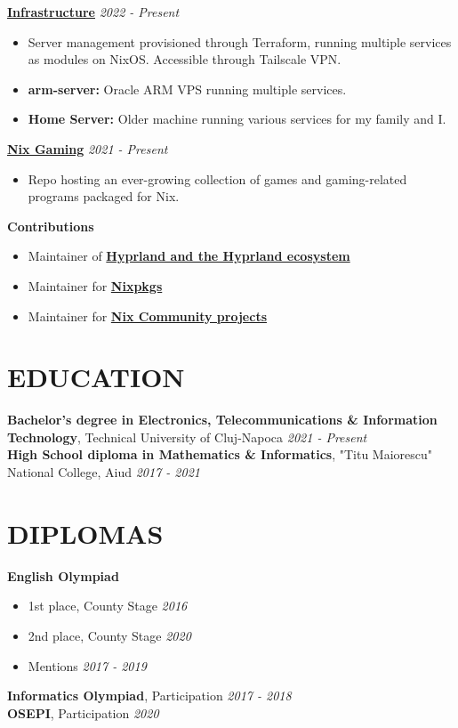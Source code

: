 \documentclass[margin]{res}
\begin{document}
\begin{resume}
  {\bf \href{https://github.com/fufexan/infra}{Infrastructure}} \hfill \textit{2022 - Present}\\
  \begin{itemize}
    \item Server management provisioned through Terraform, running multiple services as modules on NixOS. Accessible through Tailscale VPN.
    \item \textbf{arm-server:} Oracle ARM VPS running multiple services.
    \item \textbf{Home Server:} Older machine running various services for my family and I.
  \end{itemize}

  {\bf \href{https://github.com/fufexan/nix-gaming}{Nix Gaming}} \hfill \textit{2021 - Present}\\
  \begin{itemize}
    \item Repo hosting an ever-growing collection of games and gaming-related programs packaged for Nix.
  \end{itemize}

  {\bf Contributions}
  \begin{itemize}
    \item Maintainer of \href{https://github.com/hyprwm}{\textbf{Hyprland and the Hyprland ecosystem}}
    \item Maintainer for \href{https://github.com/nixos/nixpkgs}{\textbf{Nixpkgs}}
    \item Maintainer for \href{https://github.com/nix-community}{\textbf{Nix Community projects}}
  \end{itemize}

  \section{EDUCATION}
  {\bf Bachelor's degree in Electronics, Telecommunications \& Information Technology}, Technical University of Cluj-Napoca \hfill \textit{2021 - Present}\\
  {\bf High School diploma in Mathematics \& Informatics}, "Titu Maiorescu" National College, Aiud \hfill \textit{2017 - 2021}\\

  \section{DIPLOMAS}
  {\bf English Olympiad}
  \begin{itemize}
    \item 1st place, County Stage \hfill \textit{2016}
    \item 2nd place, County Stage \hfill \textit{2020}
    \item Mentions \hfill \textit{2017 - 2019}
  \end{itemize}
  {\bf Informatics Olympiad}, Participation \hfill \textit{2017 - 2018}\\
  {\bf OSEPI}, Participation \hfill \textit{2020}\\


\end{resume}
\end{document}
